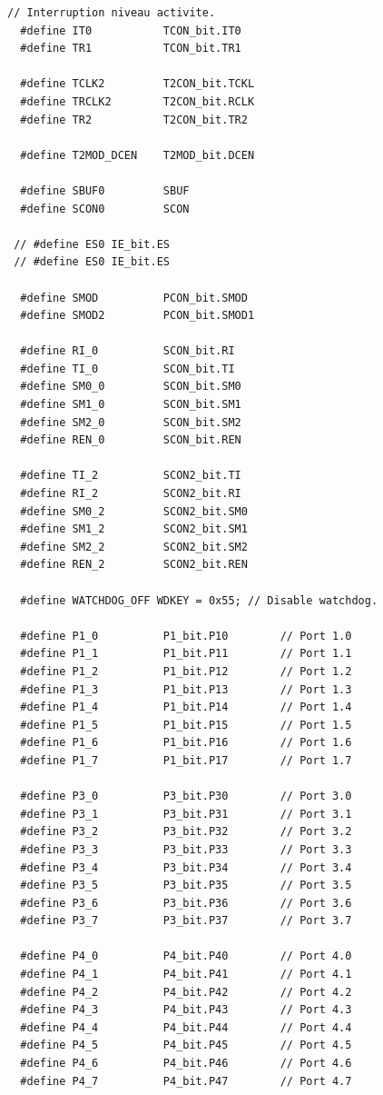 \documentclass[10pt,a4paper,final]{article}
\begin{document}
\begin{lstlisting}[label={list:first},caption=Code source]
// Interruption niveau activite.
  #define IT0           TCON_bit.IT0
  #define TR1           TCON_bit.TR1

  #define TCLK2         T2CON_bit.TCKL
  #define TRCLK2        T2CON_bit.RCLK
  #define TR2           T2CON_bit.TR2

  #define T2MOD_DCEN    T2MOD_bit.DCEN

  #define SBUF0         SBUF
  #define SCON0         SCON

 // #define ES0 IE_bit.ES
 // #define ES0 IE_bit.ES

  #define SMOD          PCON_bit.SMOD
  #define SMOD2         PCON_bit.SMOD1

  #define RI_0          SCON_bit.RI
  #define TI_0          SCON_bit.TI
  #define SM0_0         SCON_bit.SM0
  #define SM1_0         SCON_bit.SM1
  #define SM2_0         SCON_bit.SM2
  #define REN_0         SCON_bit.REN

  #define TI_2          SCON2_bit.TI
  #define RI_2          SCON2_bit.RI
  #define SM0_2         SCON2_bit.SM0
  #define SM1_2         SCON2_bit.SM1
  #define SM2_2         SCON2_bit.SM2
  #define REN_2         SCON2_bit.REN

  #define WATCHDOG_OFF WDKEY = 0x55; // Disable watchdog.

  #define P1_0          P1_bit.P10        // Port 1.0
  #define P1_1          P1_bit.P11        // Port 1.1
  #define P1_2          P1_bit.P12        // Port 1.2
  #define P1_3          P1_bit.P13        // Port 1.3
  #define P1_4          P1_bit.P14        // Port 1.4
  #define P1_5          P1_bit.P15        // Port 1.5
  #define P1_6          P1_bit.P16        // Port 1.6
  #define P1_7          P1_bit.P17        // Port 1.7

  #define P3_0          P3_bit.P30        // Port 3.0
  #define P3_1          P3_bit.P31        // Port 3.1
  #define P3_2          P3_bit.P32        // Port 3.2
  #define P3_3          P3_bit.P33        // Port 3.3
  #define P3_4          P3_bit.P34        // Port 3.4
  #define P3_5          P3_bit.P35        // Port 3.5
  #define P3_6          P3_bit.P36        // Port 3.6
  #define P3_7          P3_bit.P37        // Port 3.7

  #define P4_0          P4_bit.P40        // Port 4.0
  #define P4_1          P4_bit.P41        // Port 4.1
  #define P4_2          P4_bit.P42        // Port 4.2
  #define P4_3          P4_bit.P43        // Port 4.3
  #define P4_4          P4_bit.P44        // Port 4.4
  #define P4_5          P4_bit.P45        // Port 4.5
  #define P4_6          P4_bit.P46        // Port 4.6
  #define P4_7          P4_bit.P47        // Port 4.7


\end{lstlisting}
\end{document}
